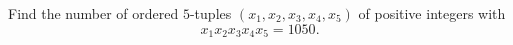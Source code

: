 Find the number of ordered $5$-tuples $(x_1,x_2,x_3,x_4,x_5)$ of positive integers with
\[x_1x_2x_3x_4x_5=1050.\]
